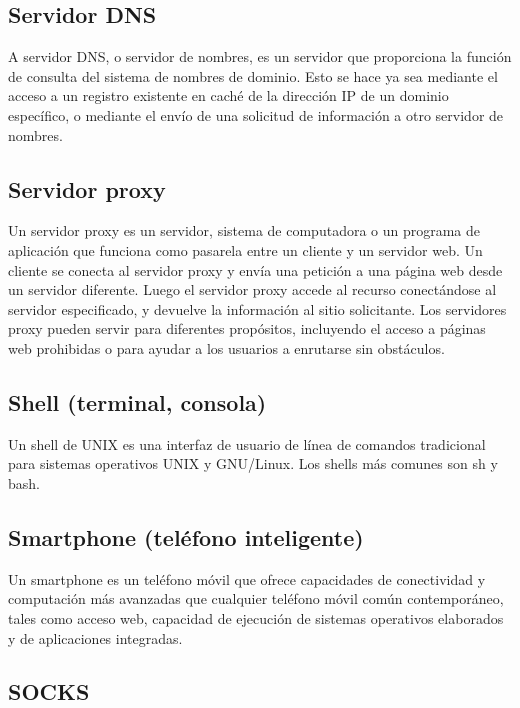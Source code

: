 \subsection{Servidor DNS}\label{servidor-dns}

A servidor DNS, o servidor de nombres, es un servidor que proporciona la
función de consulta del sistema de nombres de dominio. Esto se hace ya
sea mediante el acceso a un registro existente en caché de la dirección
IP de un dominio específico, o mediante el envío de una solicitud de
información a otro servidor de nombres.

\subsection{Servidor proxy}\label{servidor-proxy}

Un servidor proxy es un servidor, sistema de computadora o un programa
de aplicación que funciona como pasarela entre un cliente y un servidor
web. Un cliente se conecta al servidor proxy y envía una petición a una
página web desde un servidor diferente. Luego el servidor proxy accede
al recurso conectándose al servidor especificado, y devuelve la
información al sitio solicitante. Los servidores proxy pueden servir
para diferentes propósitos, incluyendo el acceso a páginas web
prohibidas o para ayudar a los usuarios a enrutarse sin obstáculos.

\subsection{Shell (terminal, consola)}\label{shell-terminal-consola}

Un shell de UNIX es una interfaz de usuario de línea de comandos
tradicional para sistemas operativos UNIX y GNU/Linux. Los shells más
comunes son sh y bash.

\subsection{Smartphone (teléfono
inteligente)}\label{smartphone-teluxe9fono-inteligente}

Un smartphone es un teléfono móvil que ofrece capacidades de
conectividad y computación más avanzadas que cualquier teléfono móvil
común contemporáneo, tales como acceso web, capacidad de ejecución de
sistemas operativos elaborados y de aplicaciones integradas.

\subsection{SOCKS}\label{socks}

